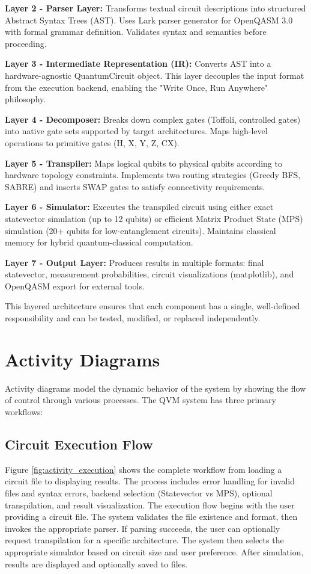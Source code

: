 \textbf{Layer 2 - Parser Layer:} Transforms textual circuit descriptions into structured Abstract Syntax Trees (AST). Uses Lark parser generator for OpenQASM 3.0 with formal grammar definition. Validates syntax and semantics before proceeding.

\textbf{Layer 3 - Intermediate Representation (IR):} Converts AST into a hardware-agnostic QuantumCircuit object. This layer decouples the input format from the execution backend, enabling the "Write Once, Run Anywhere" philosophy.

\textbf{Layer 4 - Decomposer:} Breaks down complex gates (Toffoli, controlled gates) into native gate sets supported by target architectures. Maps high-level operations to primitive gates (H, X, Y, Z, CX).

\textbf{Layer 5 - Transpiler:} Maps logical qubits to physical qubits according to hardware topology constraints. Implements two routing strategies (Greedy BFS, SABRE) and inserts SWAP gates to satisfy connectivity requirements.

\textbf{Layer 6 - Simulator:} Executes the transpiled circuit using either exact statevector simulation (up to 12 qubits) or efficient Matrix Product State (MPS) simulation (20+ qubits for low-entanglement circuits). Maintains classical memory for hybrid quantum-classical computation.

\textbf{Layer 7 - Output Layer:} Produces results in multiple formats: final statevector, measurement probabilities, circuit visualizations (matplotlib), and OpenQASM export for external tools.

This layered architecture ensures that each component has a single, well-defined responsibility and can be tested, modified, or replaced independently.

\section{Activity Diagrams}
Activity diagrams model the dynamic behavior of the system by showing the flow of control through various processes. The QVM system has three primary workflows:

\subsection{Circuit Execution Flow}
Figure \ref{fig:activity_execution} shows the complete workflow from loading a circuit file to displaying results. The process includes error handling for invalid files and syntax errors, backend selection (Statevector vs MPS), optional transpilation, and result visualization. The execution flow begins with the user providing a circuit file. The system validates the file existence and format, then invokes the appropriate parser. If parsing succeeds, the user can optionally request transpilation for a specific architecture. The system then selects the appropriate simulator based on circuit size and user preference. After simulation, results are displayed and optionally saved to files.

